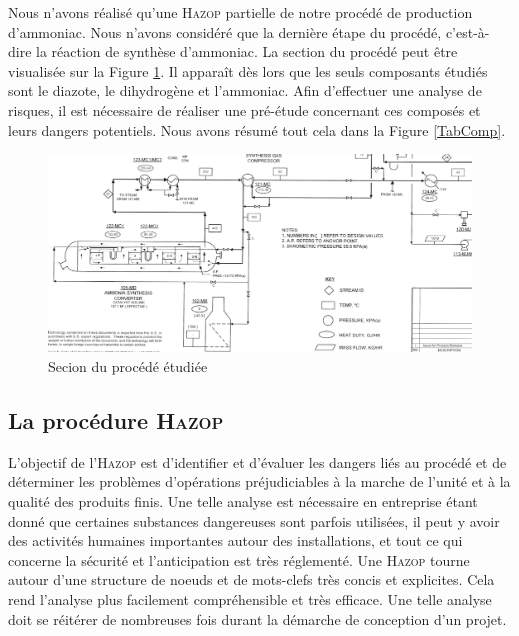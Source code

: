\documentclass{article}
\begin{document}
Nous n'avons réalisé qu'une \textsc{Hazop} partielle de notre procédé de production d'ammoniac. Nous n'avons considéré que la dernière étape du procédé, c'est-à-dire la réaction de synthèse d'ammoniac. La section du procédé peut être visualisée sur la Figure \ref{section_procede}. Il apparaît dès lors que les seuls composants étudiés sont le diazote, le dihydrogène et l'ammoniac. Afin d'effectuer une analyse de risques, il est nécessaire de réaliser une pré-étude concernant ces composés et leurs dangers potentiels. Nous avons résumé tout cela dans la Figure \ref{TabComp}.

\begin{figure}[ht!]
 \centering
 \includegraphics[scale=0.3]{section_procede.PNG}
 \caption{Secion du procédé étudiée}
 \label{section_procede}
\end{figure}

\subsection{La procédure \textsc{Hazop}}

L’objectif de l’\textsc{Hazop} est d’identifier et d’évaluer les dangers liés au procédé et de déterminer les problèmes d’opérations préjudiciables à la marche de l’unité et à la qualité des produits finis. Une telle analyse est nécessaire en entreprise étant donné que certaines substances dangereuses sont parfois utilisées, il peut y avoir des activités humaines importantes autour des installations, et tout ce qui concerne la sécurité et l'anticipation est très réglementé. Une \textsc{Hazop} tourne autour d'une structure de noeuds et de mots-clefs très concis et explicites. Cela rend l'analyse plus facilement compréhensible et très efficace.
Une telle analyse doit se réitérer de nombreuses fois durant la démarche de conception d'un projet.
\end{document}
